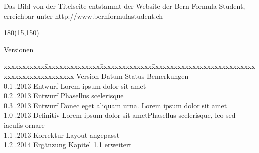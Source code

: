 Das Bild von der Titelseite entstammt der Website der Bern Formula Student, erreichbar unter http://www.bernformulastudent.ch

\begin{textblock}{180}(15,150)
\color{black}
\begin{huge}
Versionen
\end{huge}
\vspace{10mm}

\fontsize{10pt}{18pt}\selectfont
\begin{tabbing}
xxxxxxxxxxx\=xxxxxxxxxxxxxxx\=xxxxxxxxxxxxxx\=xxxxxxxxxxxxxxxxxxxxxxxxxxxxxxxxxxxxxxxxxxxxxxx \kill
Version	\> Datum	\> Status		\> Bemerkungen		\\
0.1	.2013	\> Entwurf		\> Lorem ipsum dolor sit amet	\\	
0.2	.2013	\> Entwurf		\> Phasellus scelerisque	\\ 
0.3	.2013	\> Entwurf		\> Donec eget aliquam urna. Lorem ipsum dolor sit amet	\\ 
1.0	.2013	\> Definitiv	\> Lorem ipsum dolor sit ametPhasellus scelerisque, leo sed iaculis ornare 	\\ 
1.1	.2013	\> Korrektur	\> Layout angepasst	\\
1.2	.2014	\> Ergänzung	\> Kapitel 1.1 erweitert	\\
\end{tabbing}

\end{textblock}

